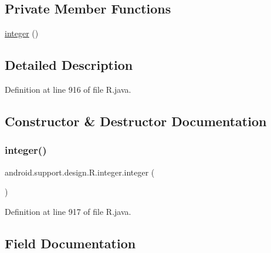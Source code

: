 \subsection*{Private Member Functions}
\begin{DoxyCompactItemize}
\item 
\mbox{\hyperlink{classandroid_1_1support_1_1design_1_1_r_1_1integer_ac80606641d5b9d520d155bdc03704883}{integer}} ()
\end{DoxyCompactItemize}


\subsection{Detailed Description}


Definition at line 916 of file R.\+java.



\subsection{Constructor \& Destructor Documentation}
\mbox{\label{classandroid_1_1support_1_1design_1_1_r_1_1integer_ac80606641d5b9d520d155bdc03704883}} 
\subsubsection{\texorpdfstring{integer()}{integer()}}
{\footnotesize\ttfamily android.\+support.\+design.\+R.\+integer.\+integer (\begin{DoxyParamCaption}{ }\end{DoxyParamCaption})\hspace{0.3cm}{\ttfamily [private]}}



Definition at line 917 of file R.\+java.


\begin{DoxyCode}{0}

\end{DoxyCode}


\subsection{Field Documentation}
\mbox{\label{classandroid_1_1support_1_1design_1_1_r_1_1integer_ab0c8a771ad2ae3aba6dc8d9823755f3e}} 
